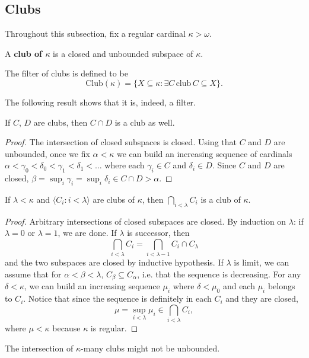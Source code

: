 \documentclass[twoside,openright,titlepage,numbers=noenddot,%
               headinclude,footinclude,cleardoublepage=empty,abstract=on,
               BCOR=23mm,paper=letter,fontsize=11pt
               ]{scrreprt}
\begin{document}
\subsection{Clubs}
Throughout this subsection, fix a regular cardinal $\kappa > \omega$.
\begin{definition}
    A \textbf{club of $\kappa$} is a closed and unbounded subspace of $\kappa$.
\end{definition}
\begin{definition}
    The filter of clubs is defined to be
    \[ \mathrm{Club}(\kappa) = \{ X \subseteq \kappa: \exists C \, \text{club} \, C \subseteq X\}. \]
\end{definition}
The following result shows that it is, indeed, a filter.
\begin{proposition}
    If $C$, $D$ are clubs, then $C \cap D$ is a club as well.
\end{proposition}
\begin{proof}
    The intersection of closed subspaces is closed. Using that $C$ and $D$ are unbounded, once we fix $\alpha < \kappa$ we can build an increasing sequence of cardinals $\alpha < \gamma_0 < \delta_0 < \gamma_1 < \delta_1 < \dots$ where each $\gamma_i \in C$ and $\delta_i \in D$. Since $C$ and $D$ are closed, $\beta = \sup_{i}\gamma_i = \sup_{i}\delta_i \in C \cap D > \alpha$.
\end{proof}
\begin{proposition}
    If $\lambda < \kappa$ and $\langle C_i: i < \lambda\rangle$ are clubs of $\kappa$, then $\bigcap_{i < \lambda} C_i$ is a club of $\kappa$. 
\end{proposition}
\begin{proof}
    Arbitrary intersections of closed subspaces are closed. By induction on $\lambda$: if $\lambda = 0$ or $\lambda = 1$, we are done. If $\lambda$ is successor, then
    \[ \bigcap_{i < \lambda} C_i = \bigcap_{i < \lambda-1} C_i \cap C_{\lambda} \]
    and the two subspaces are closed by inductive hypothesis. If $\lambda$ is limit, we can assume that for $\alpha < \beta < \lambda$, $C_\beta \subseteq C_\alpha$, i.e. that the sequence is decreasing.
    For any $\delta < \kappa$, we can build an increasing sequence $\mu_i$ where $\delta < \mu_0$ and each $\mu_i$ belongs to $C_i$. Notice that since the sequence is definitely in each $C_i$ and they are closed,
    \[ \mu = \sup_{i < \lambda} \mu_i \in \bigcap_{i < \lambda} C_i, \]
    where $\mu < \kappa$ because $\kappa$ is regular.
\end{proof}
The intersection of $\kappa$-many clubs might not be unbounded.
\end{document}
